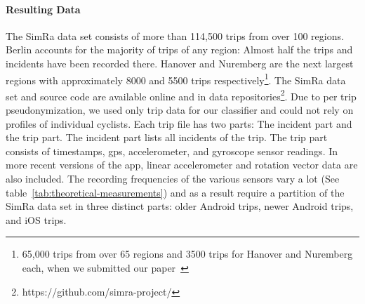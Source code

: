 \paragraph{Resulting Data}
The SimRa data set consists of more than 114,500 trips from over 100 regions.
Berlin accounts for the majority of trips of any region: Almost half the trips and incidents have been recorded there.
Hanover and Nuremberg are the next largest regions with approximately 8000 and 5500 trips respectively\footnote{65,000 trips from over 65 regions and 3500 trips for Hanover and Nuremberg each, when we submitted our paper~\cite{karakaya2023cyclesense}}.
The SimRa data set and source code are available online and in data repositories\footnote{https://github.com/simra-project/}.
Due to per trip pseudonymization, we used only trip data for our classifier and could not rely on profiles of individual cyclists.
Each trip file has two parts: The incident part and the trip part.
The incident part lists all incidents of the trip.
The trip part consists of timestamps, \ac{gps}, accelerometer, and gyroscope sensor readings. In more recent versions of the app, linear accelerometer and rotation vector data are also included.
The recording frequencies of the various sensors vary a lot (See table~\ref{tab:theoretical-measurements}) and as a result require a partition of the SimRa data set in three distinct parts: older Android trips, newer Android trips, and iOS trips.



\begin{table}[ht]
	\centering
	\caption{Theoretical measurement frequencies of different sensors in different parts of the SimRa data set.
		Note that these are only the theoretical frequencies that deviate significantly from the empirical measurement frequencies that can be observed in the data set (see Section \ref{sec:discussion_cyclesense}).}
	\label{tab:theoretical-measurements}
\end{table}

